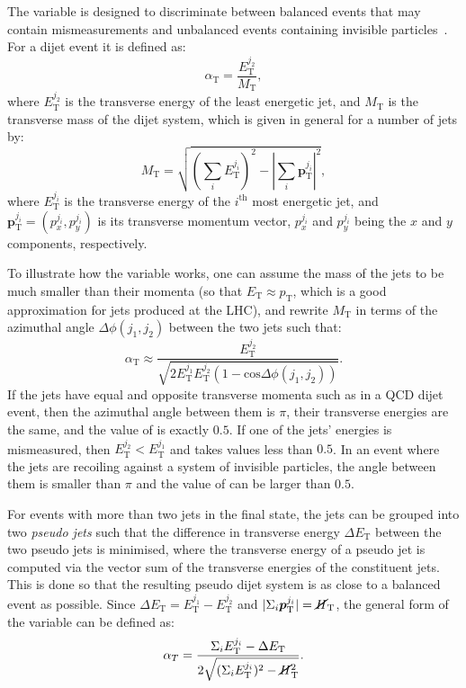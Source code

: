 The \alphat variable is designed to discriminate between balanced events that 
may contain mismeasurements and unbalanced events containing invisible 
particles~\cite{alpha-variable}. For a dijet event it is defined as:
\begin{equation}
\alpha_\mathrm T = \frac{E_\mathrm{T}^{j_2}}{M_\mathrm{T}}, 
\end{equation} 
where $E_\mathrm{T}^{j_2}$ is the transverse energy of the least energetic jet, 
and $M_\mathrm{T}$ is the transverse mass of the dijet system, which is given 
in general for a number of jets by:
\begin{equation}
M_\mathrm{T} = \sqrt{\left(\sum_{i}E_{\mathrm T}^{j_i}\right)^2 - 
\left|\sum_{i}\bm{p}_\mathrm{T}^{j_i}\right|^2},
\end{equation}
where $E_{\mathrm T}^{j_i}$ is the transverse energy of the $i^\mathrm{th}$ 
most energetic jet, and 
$\bm{p}_\mathrm{T}^{j_i} = (p_x^{j_i}, p_y^{j_i})$ is its 
transverse momentum vector, $p_x^{j_i}$ and $p_y^{j_i}$ being the $x$ and $y$ 
components, respectively. 

To illustrate how the \alphat variable works, one can assume the mass of the 
jets to be much smaller than their momenta (so that $E_\mathrm T \approx 
p_\mathrm T$, which is a good approximation for jets produced at the LHC), and 
rewrite $M_\mathrm T$ in terms of the 
azimuthal angle $\Delta\phi(j_1,j_2)$ between the two jets such that:
\begin{equation}
\alpha_\mathrm T \approx \frac{E_\mathrm{T}^{j_2}}{\sqrt{2E_{\mathrm 
T}^{j_1}E_{\mathrm T}^{j_2}(1-\mathrm{cos}\Delta\phi(j_1,j_2))}}.
\end{equation}
If the jets have equal and opposite transverse momenta such as in a QCD dijet 
event, then the azimuthal angle between them is $\pi$, their transverse 
energies are the same, and the value of \alphat is exactly $0.5$. If one of the 
jets' energies is mismeasured, then $E_\mathrm{T}^{j_2} < E_\mathrm{T}^{j_1}$ 
and \alphat takes values less than $0.5$. In an event where the jets are 
recoiling against a system of invisible particles, the angle between them is 
smaller than $\pi$ and the value of \alphat can be larger than $0.5$.

For events with more than two jets in the final state, the jets can be grouped 
into two \textit{pseudo jets} such that the difference in transverse energy 
$\Delta E_\mathrm T$ between the two pseudo jets is minimised, where the 
transverse energy of a pseudo jet is computed via the vector sum of the 
transverse energies of the constituent jets. This is done so that the resulting 
pseudo dijet system is as close to a balanced event as possible. Since $\Delta 
E_\mathrm T = E_\mathrm{T}^{j_1} - E_\mathrm{T}^{j_2}$ and 
$|\Sigma_i\bm{p}_\mathrm{T}^{j_i}| = \mbox{$\cancel{H}_\text{T}$}$, the general form of the \alphat 
variable can be defined as:
\begin{equation}
\alpha_T=\frac{\Sigma_i E_\mathrm{T}^{j_i}-\Delta 
E_\mathrm{T}}{2\sqrt{(\Sigma_i E_\mathrm{T}^{j_i})^2-\cancel{H}_\mathrm{T}^2}}.
\end{equation}

